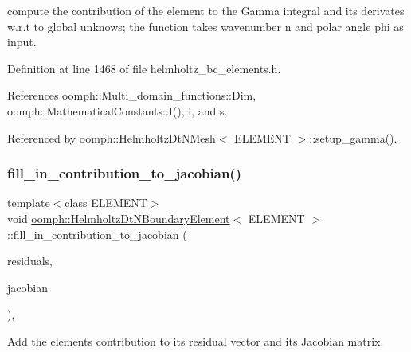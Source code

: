 compute the contribution of the element to the Gamma integral and its derivates w.\+r.\+t to global unknows; the function takes wavenumber n and polar angle phi as input. 

Definition at line 1468 of file helmholtz\+\_\+bc\+\_\+elements.\+h.



References oomph\+::\+Multi\+\_\+domain\+\_\+functions\+::\+Dim, oomph\+::\+Mathematical\+Constants\+::\+I(), i, and s.



Referenced by oomph\+::\+Helmholtz\+Dt\+N\+Mesh$<$ E\+L\+E\+M\+E\+N\+T $>$\+::setup\+\_\+gamma().

\mbox{\label{classoomph_1_1HelmholtzDtNBoundaryElement_afb3ab9366490295ba422a9c3fa7d6279}} 
\subsubsection{\texorpdfstring{fill\+\_\+in\+\_\+contribution\+\_\+to\+\_\+jacobian()}{fill\_in\_contribution\_to\_jacobian()}}
{\footnotesize\ttfamily template$<$class E\+L\+E\+M\+E\+NT$>$ \\
void \hyperlink{classoomph_1_1HelmholtzDtNBoundaryElement}{oomph\+::\+Helmholtz\+Dt\+N\+Boundary\+Element}$<$ E\+L\+E\+M\+E\+NT $>$\+::fill\+\_\+in\+\_\+contribution\+\_\+to\+\_\+jacobian (\begin{DoxyParamCaption}\item[{\hyperlink{classoomph_1_1Vector}{Vector}$<$ double $>$ \&}]{residuals,  }\item[{\hyperlink{classoomph_1_1DenseMatrix}{Dense\+Matrix}$<$ double $>$ \&}]{jacobian }\end{DoxyParamCaption})\hspace{0.3cm}{\ttfamily [inline]}, {\ttfamily [virtual]}}



Add the element\textquotesingle{}s contribution to its residual vector and its Jacobian matrix. 



